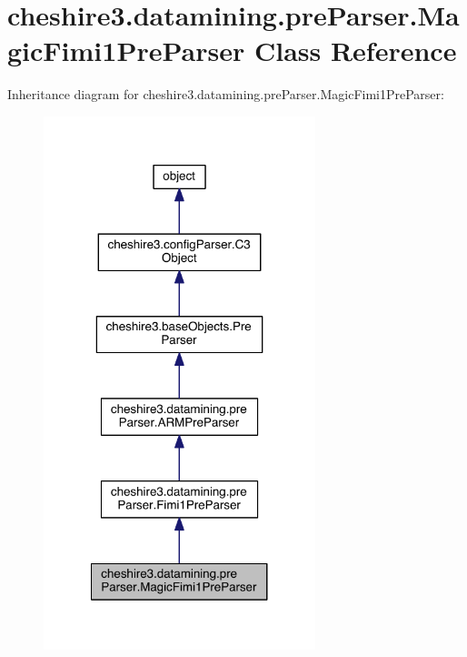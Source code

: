 \hypertarget{classcheshire3_1_1datamining_1_1pre_parser_1_1_magic_fimi1_pre_parser}{\section{cheshire3.\-datamining.\-pre\-Parser.\-Magic\-Fimi1\-Pre\-Parser Class Reference}
\label{classcheshire3_1_1datamining_1_1pre_parser_1_1_magic_fimi1_pre_parser}
}


Inheritance diagram for cheshire3.\-datamining.\-pre\-Parser.\-Magic\-Fimi1\-Pre\-Parser\-:
\nopagebreak
\begin{figure}[H]
\begin{center}
\leavevmode
\includegraphics[width=224pt]{classcheshire3_1_1datamining_1_1pre_parser_1_1_magic_fimi1_pre_parser__inherit__graph}
\end{center}
\end{figure}


